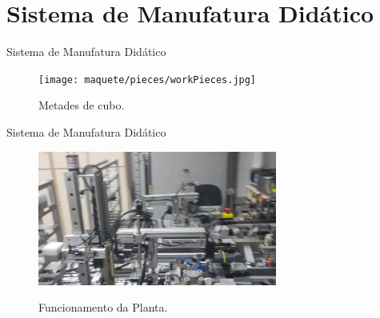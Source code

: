 \section{Sistema de Manufatura Didático}

\begin{frame}{Sistema de Manufatura Didático}
\begin{figure}[H]
  \centering
  \texttt{[image: maquete/pieces/workPieces.jpg]}
  \caption{Metades de cubo.}
  \label{fig:cubeHalves}
\end{figure}
\end{frame}

\begin{frame}{Sistema de Manufatura Didático}
\centering
   \begin{figure}[ht]
\href{run:../../videos/tccReduz.avi}{\includegraphics[width=0.7\textwidth]{../../videos/TCCVIDEO_cycle.jpg}}
  \caption{Funcionamento da Planta.}
   \end{figure}
\end{frame}

